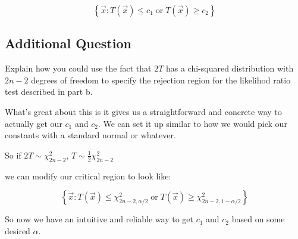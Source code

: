 \[
	\left\{ \vec{x}: T(\vec{x}) \leq c_1 \; \text{or} \; T(\vec{x}) \geq c_2 \right\}
\]

\subsection{Additional Question}

Explain how you could use the fact that $2T$ has a chi-squared distribution with $2n-2$ degrees of freedom to specify the rejection region for the likelihod ratio test described in part b.

What's great about this is it gives us a straightforward and concrete way to actually get our $c_1$ and $c_2$. We can set it up similar to how we would pick our constants with a standard normal or whatever. 

So if $2T \sim \chi^2_{2n-2}$, $T \sim \frac{1}{2} \chi^2_{2n-2}$

we can modify our critical region to look like:

\[
	\left\{ \vec{x}: T(\vec{x}) \leq \chi^2_{2n-2, \alpha/2} \; \text{or} \; T(\vec{x}) \geq \chi^2_{2n-2, 1-\alpha/2}  \right\}
\]

So now we have an intuitive and reliable way to get $c_1$ and $c_2$ based on some desired $\alpha$.
